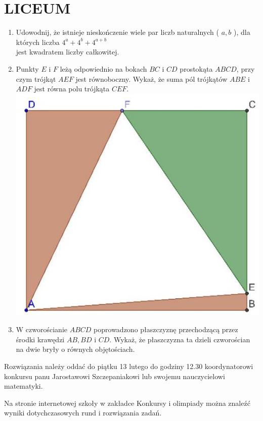 \documentclass[10pt]{article}
\begin{document}
\section*{LICEUM}
\begin{enumerate}
  \item Udowodnij, że istnieje nieskończenie wiele par liczb naturalnych ( \(a, b\) ), dla których liczba \(4^{a}+4^{b}+4^{a+b}\)\\
jest kwadratem liczby całkowitej.
  \item Punkty \(E\) i \(F\) leżą odpowiednio na bokach \(B C\) i \(C D\) prostokąta \(A B C D\), przy czym trójkąt \(A E F\) jest równoboczny. Wykaż, że suma pól trójkątów \(A B E\) i \(A D F\) jest równa polu trójkąta \(C E F\).\\
\includegraphics[max width=\textwidth, center]{2024_11_21_e31b2faaa846039f7212g-1(1)}
  \item W czworościanie \(A B C D\) poprowadzono płaszczyznę przechodzącą przez środki krawędzi \(A B, B D\) i \(C D\). Wykaż, że płaszczyzna ta dzieli czworościan na dwie bryły o równych objętościach.
\end{enumerate}

Rozwiązania należy oddać do piątku 13 lutego do godziny 12.30 koordynatorowi konkursu panu Jarostawowi Szczepaniakowi lub swojemu nauczycielowi matematyki.

Na stronie internetowej szkoły w zakładce Konkursy i olimpiady można znaleźć wyniki dotychczasowych rund i rozwiązania zadań.
\end{document}
